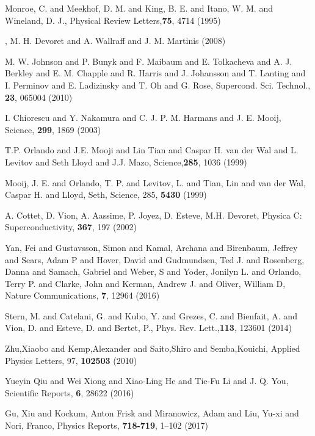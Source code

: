 \begin{thebibliography}{99}

	{Monroe, C. and Meekhof, D. M. and King, B. E. and Itano, W. M. and Wineland, D. J.}, {Physical Review Letters},\textbf{75}, 4714 (1995)
	
	, {M. H. Devoret and A. Wallraff and J. M. Martinis} (2008)
	
	{M. W. Johnson and P. Bunyk and F. Maibaum and E. Tolkacheva and A. J. Berkley and E. M. Chapple and R. Harris and J. Johansson and T. Lanting and I. Perminov and E. Ladizinsky and T. Oh and G. Rose}, {Supercond. Sci. Technol.}, \textbf{23}, {065004} (2010)
	
	{I. Chiorescu and Y. Nakamura and C. J. P. M. Harmans and J. E. Mooij}, {Science}, \textbf{299}, 1869 (2003)	
	
	{T.P. Orlando and J.E. Mooji and Lin Tian and Caspar H. van der Wal and L. Levitov and Seth Lloyd and J.J. Mazo}, {Science},\textbf{285}, {1036} (1999)
	
	{Mooij, J. E. and Orlando, T. P. and Levitov, L. and Tian, Lin and van der Wal, Caspar H. and Lloyd, Seth}, {Science}, 285, \textbf{5430} (1999)
		
	A. Cottet, D. Vion, A. Aassime, P. Joyez, D. Esteve, M.H. Devoret,
Physica C: Superconductivity, \textbf{367}, 197 (2002)
	
	Yan, Fei and Gustavsson, Simon and Kamal, Archana and Birenbaum, Jeffrey and Sears, Adam P and Hover, David and Gudmundsen, Ted J. and Rosenberg, Danna and Samach, Gabriel and Weber, S and Yoder, Jonilyn L. and Orlando, Terry P. and Clarke, John and Kerman, Andrew J. and Oliver, William D, Nature Communications, \textbf{7}, 12964 (2016)
	
	Stern, M. and Catelani, G. and Kubo, Y. and Grezes, C. and Bienfait, A. and Vion, D. and Esteve, D. and Bertet, P., Phys. Rev. Lett.,\textbf{113}, 123601 (2014)
	
	Zhu,Xiaobo and Kemp,Alexander and Saito,Shiro and Semba,Kouichi, Applied Physics Letters, 97, \textbf{102503} (2010)
	
	Yueyin Qiu and Wei Xiong and Xiao-Ling He and Tie-Fu Li and J. Q. You, Scientific Reports, \textbf{6}, 28622 (2016)	
	
	Gu, Xiu and Kockum, Anton Frisk and Miranowicz, Adam and Liu, Yu-xi and Nori, Franco, Physics Reports, \textbf{718-719}, 1--102 (2017)
	


\end{thebibliography}
